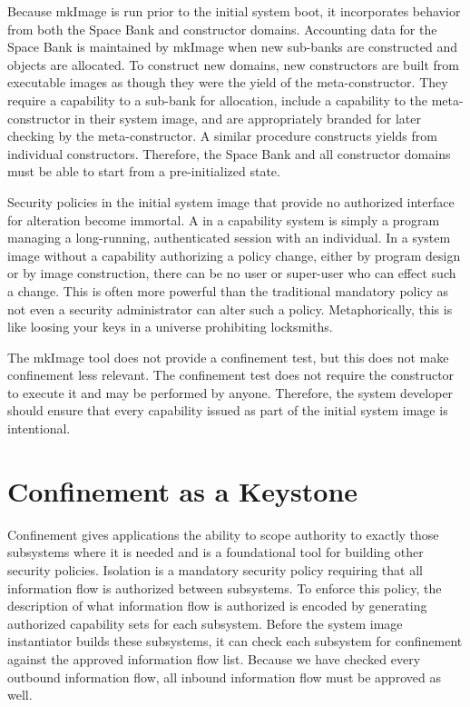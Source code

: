 Because mkImage is run prior to the initial system boot, it incorporates behavior from both the Space Bank and constructor domains.
Accounting data for the Space Bank is maintained by mkImage when new sub-banks are constructed and objects are allocated.
To construct new domains, new constructors are built from executable images as though they were the yield of the meta-constructor.
They require a capability to a sub-bank for allocation, include a capability to the meta-constructor in their system image, and are appropriately branded for later checking by the meta-constructor.
A similar procedure constructs yields from individual constructors.
Therefore, the Space Bank and all constructor domains must be able to start from a pre-initialized state.

Security policies in the initial system image that provide no authorized interface for alteration become immortal.
A  in a capability system is simply a program managing a long-running, authenticated session with an individual.
In a system image without a capability authorizing a policy change, either by program design or by image construction, there can be no user or super-user who can effect such a change.
This is often more powerful than the traditional mandatory policy as not even a security administrator can alter such a policy.
Metaphorically, this is like loosing your keys in a universe prohibiting locksmiths.

The mkImage tool does not provide a confinement test, but this does not make confinement less relevant.
The confinement test does not require the constructor to execute it and may be performed by anyone.
Therefore, the system developer should ensure that every capability issued as part of the initial system image is intentional.

\section{Confinement as a Keystone}

Confinement gives applications the ability to scope authority to exactly those subsystems where it is needed and is a foundational tool for building other security policies.
Isolation is a mandatory security policy requiring that all information flow is authorized between subsystems.
To enforce this policy, the description of what information flow is authorized is encoded by generating authorized capability sets for each subsystem.
Before the system image instantiator builds these subsystems, it can check each subsystem for confinement against the approved information flow list.
Because we have checked every outbound information flow, all inbound information flow must be approved as well.

